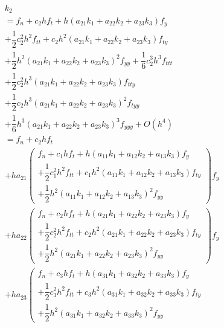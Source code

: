 \documentclass[a4paper,oneside]{book}
\numberwithin{equation}{chapter}
\begin{document}
\begin{align}
&{k_2}\\
& = {f_n} + {c_2}h{f_t} + h\left( {{a_{21}}{k_1} + {a_{22}}{k_2} + {a_{23}}{k_3}} \right){f_y}\\
 &+ \dfrac{1}{2}c_2^2{h^2}{f_{tt}} + {c_2}{h^2}\left( {{a_{21}}{k_1} + {a_{22}}{k_2} + {a_{23}}{k_3}} \right){f_{ty}}\\
& + \dfrac{1}{2}{h^2}{\left( {{a_{21}}{k_1} + {a_{22}}{k_2} + {a_{23}}{k_3}} \right)^2}{f_{yy}} + \dfrac{1}{6}c_2^3{h^3}{f_{ttt}}\\
 &+ \dfrac{1}{2}c_2^2{h^3}\left( {{a_{21}}{k_1} + {a_{22}}{k_2} + {a_{23}}{k_3}} \right){f_{tty}}\\
 &+ \dfrac{1}{2}{c_2}{h^3}{\left( {{a_{21}}{k_1} + {a_{22}}{k_2} + {a_{23}}{k_3}} \right)^2}{f_{tyy}}\\
 &+ \dfrac{1}{6}{h^3}{\left( {{a_{21}}{k_1} + {a_{22}}{k_2} + {a_{23}}{k_3}} \right)^3}{f_{yyy}} + O\left( {{h^4}} \right)\\
& = {f_n} + {c_2}h{f_t}\\
 &+ h{a_{21}}\left( \begin{array}{l}
{f_n} + {c_1}h{f_t} + h\left( {{a_{11}}{k_1} + {a_{12}}{k_2} + {a_{13}}{k_3}} \right){f_y}\\
 + \dfrac{1}{2}c_1^2{h^2}{f_{tt}} + {c_1}{h^2}\left( {{a_{11}}{k_1} + {a_{12}}{k_2} + {a_{13}}{k_3}} \right){f_{ty}}\\
 + \dfrac{1}{2}{h^2}{\left( {{a_{11}}{k_1} + {a_{12}}{k_2} + {a_{13}}{k_3}} \right)^2}{f_{yy}}
\end{array} \right){f_y}\\
&+ h{a_{22}}\left( \begin{array}{l}
{f_n} + {c_2}h{f_t} + h\left( {{a_{21}}{k_1} + {a_{22}}{k_2} + {a_{23}}{k_3}} \right){f_y}\\
 + \dfrac{1}{2}c_2^2{h^2}{f_{tt}} + {c_2}{h^2}\left( {{a_{21}}{k_1} + {a_{22}}{k_2} + {a_{23}}{k_3}} \right){f_{ty}}\\
 + \dfrac{1}{2}{h^2}{\left( {{a_{21}}{k_1} + {a_{22}}{k_2} + {a_{23}}{k_3}} \right)^2}{f_{yy}}
\end{array} \right){f_y}\\
& + h{a_{23}}\left( \begin{array}{l}
{f_n} + {c_3}h{f_t} + h\left( {{a_{31}}{k_1} + {a_{32}}{k_2} + {a_{33}}{k_3}} \right){f_y}\\
 + \dfrac{1}{2}c_3^2{h^2}{f_{tt}} + {c_3}{h^2}\left( {{a_{31}}{k_1} + {a_{32}}{k_2} + {a_{33}}{k_3}} \right){f_{ty}}\\
 + \dfrac{1}{2}{h^2}{\left( {{a_{31}}{k_1} + {a_{32}}{k_2} + {a_{33}}{k_3}} \right)^2}{f_{yy}}

\end{array}
\end{align}
\end{document}
